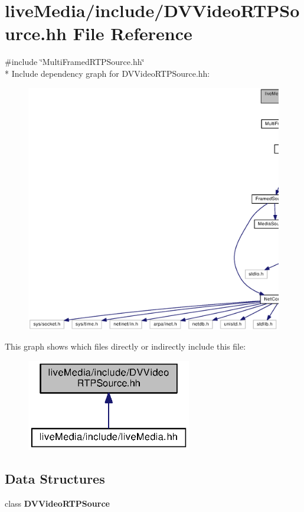 \section{live\+Media/include/\+D\+V\+Video\+R\+T\+P\+Source.hh File Reference}
\label{DVVideoRTPSource_8hh}
{\ttfamily \#include \char`\"{}Multi\+Framed\+R\+T\+P\+Source.\+hh\char`\"{}}\\*
Include dependency graph for D\+V\+Video\+R\+T\+P\+Source.\+hh\+:
\nopagebreak
\begin{figure}[H]
\begin{center}
\leavevmode
\includegraphics[width=350pt]{DVVideoRTPSource_8hh__incl}
\end{center}
\end{figure}
This graph shows which files directly or indirectly include this file\+:
\nopagebreak
\begin{figure}[H]
\begin{center}
\leavevmode
\includegraphics[width=204pt]{DVVideoRTPSource_8hh__dep__incl}
\end{center}
\end{figure}
\subsection*{Data Structures}
\begin{DoxyCompactItemize}
\item 
class {\bf D\+V\+Video\+R\+T\+P\+Source}
\end{DoxyCompactItemize}
